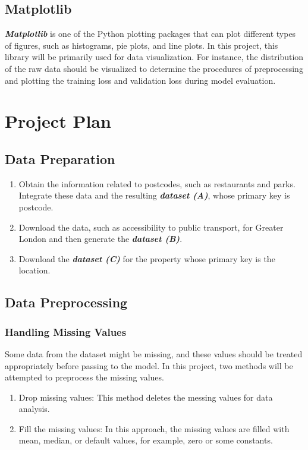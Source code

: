 \documentclass[12pt,twoside]{report}
\begin{document}
\section{Matplotlib}
\textbf{\textit{Matplotlib}} is one of the Python plotting packages that can plot different types of figures, such as histograms, pie plots, and line plots. In this project, this library will be primarily used for data visualization. For instance, the distribution of the raw data should be visualized to determine the procedures of preprocessing and plotting the training loss and validation loss during model evaluation. 



\chapter{Project Plan}

\section{Data Preparation}
\begin{enumerate}
	\item Obtain the information related to postcodes, such as restaurants and parks. Integrate these data and the resulting \textit{\textbf{dataset (A)}}, whose primary key is postcode. 
	\item Download the data, such as accessibility to public transport, for Greater London and then generate the \textit{\textbf{dataset (B)}}.
	\item Download the \textbf{\textit{dataset (C)}} for the property whose primary key is the location. 
\end{enumerate}

\section{Data Preprocessing}
\subsection{Handling Missing Values}
Some data from the dataset might be missing, and these values should be treated appropriately before passing to the model. In this project, two methods will be attempted to preprocess the missing values.
\begin{enumerate}
	\item Drop missing values: This method deletes the messing values for data analysis.
	\item Fill the missing values: In this approach, the missing values are filled with mean, median, or default values, for example, zero or some constants.
\end{enumerate}
\end{document}
